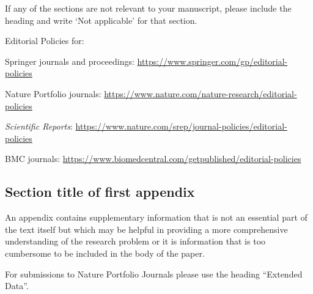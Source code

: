 \documentclass[sn-basic,pdflatex]{sn-jnl}
\theoremstyle{remark}
\theoremstyle{definition}
\begin{document}
\noindent If any of the sections are not relevant to your manuscript,
please include the heading and write `Not applicable' for that section.

\begin{flushleft}
Editorial Policies for:

\noindent Springer journals and proceedings:
\url{https://www.springer.com/gp/editorial-policies}

\noindent Nature Portfolio journals:
\url{https://www.nature.com/nature-research/editorial-policies}

\noindent \textit{Scientific Reports}:
\url{https://www.nature.com/srep/journal-policies/editorial-policies}

\noindent BMC journals:
\url{https://www.biomedcentral.com/getpublished/editorial-policies}

\end{flushleft}

\begin{appendices}

\hypertarget{secA1}{%
\section{Section title of first appendix}\label{secA1}}

An appendix contains supplementary information that is not an essential
part of the text itself but which may be helpful in providing a more
comprehensive understanding of the research problem or it is information
that is too cumbersome to be included in the body of the paper.

For submissions to Nature Portfolio Journals please use the heading
``Extended Data''.

\end{appendices}


\end{document}
